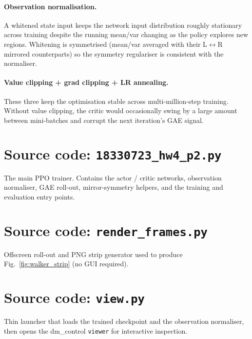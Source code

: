 \documentclass[11pt]{article}
\begin{document}
\paragraph{Observation normalisation.} A whitened state input keeps the
network input distribution roughly stationary across training despite
the running mean/var changing as the policy explores new regions.
Whitening is symmetrised (mean/var averaged with their L$\leftrightarrow$R
mirrored counterparts) so the symmetry regulariser is consistent with the
normaliser.

\paragraph{Value clipping + grad clipping + LR annealing.} These three
keep the optimisation stable across multi-million-step training. Without
value clipping, the critic would occasionally swing by a large amount
between mini-batches and corrupt the next iteration's GAE signal.

\clearpage
\appendix

\section{Source code: \texttt{18330723\_hw4\_p2.py}}
\label{app:main}
The main PPO trainer. Contains the actor / critic networks, observation
normaliser, GAE roll-out, mirror-symmetry helpers, and the training and
evaluation entry points.


\clearpage
\section{Source code: \texttt{render\_frames.py}}
\label{app:render}
Offscreen roll-out and PNG strip generator used to produce
Fig.~\ref{fig:walker_strip} (no GUI required).


\clearpage
\section{Source code: \texttt{view.py}}
\label{app:view}
Thin launcher that loads the trained checkpoint and the observation
normaliser, then opens the dm\_control \texttt{viewer} for interactive
inspection.

\end{document}

